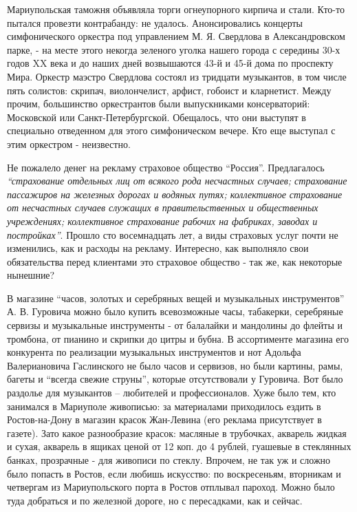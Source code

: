 Мариупольская таможня объявляла торги огнеупорного кирпича и стали. Кто-то
пытался провезти контрабанду: не удалось. Анонсировались концерты
симфонического оркестра под управлением М. Я. Свердлова в Александровском парке,
- на месте этого некогда зеленого уголка нашего города с середины 30-х годов XX
века и до наших дней возвышаются 43-й и 45-й дома по проспекту Мира. Оркестр
маэстро Свердлова состоял из тридцати музыкантов, в том числе пять солистов:
скрипач, виолончелист, арфист, гобоист и кларнетист. Между прочим, большинство
оркестрантов были выпускниками консерваторий: Московской или
Санкт-Петербургской. Обещалось, что они выступят в специально отведенном для
этого симфоническом вечере. Кто еще выступал с этим оркестром - неизвестно.

Не пожалело денег на рекламу страховое общество \enquote{Россия}. Предлагалось
\emph{\enquote{страхование отдельных лиц от всякого рода несчастных случаев; страхование
пассажиров на железных дорогах и водяных путях; коллективное страхование от
несчастных случаев служащих в правительственных и общественных учреждениях;
коллективное страхование рабочих на фабриках, заводах и постройках}}. Прошло сто
восемнадцать лет, а виды страховых услуг почти не изменились, как и расходы на
рекламу. Интересно, как выполняло свои обязательства перед клиентами это
страховое общество - так же, как некоторые нынешние?

В магазине \enquote{часов, золотых и серебряных вещей и музыкальных инструментов} А. В.
Гуровича можно было купить всевозможные часы, табакерки, серебряные сервизы и
музыкальные инструменты - от балалайки и мандолины до флейты и тромбона, от
пианино и скрипки до цитры и бубна. В ассортименте магазина его конкурента по
реализации музыкальных инструментов и нот Адольфа Валериановича Гаслинского не
было часов и сервизов, но были картины, рамы, багеты и \enquote{всегда свежие струны},
которые отсутствовали у Гуровича. Вот было раздолье для музыкантов – любителей
и профессионалов. Хуже было тем, кто занимался в Мариуполе живописью: за
материалами приходилось ездить в Ростов-на-Дону в магазин красок Жан-Левина
(его реклама присутствует в газете). Зато какое разнообразие красок: масляные в
трубочках, акварель жидкая и сухая, акварель в ящиках ценой от 12 коп. до 4
рублей, гуашевые в стеклянных банках, прозрачные - для живописи по стеклу.
Впрочем, не так уж и сложно было попасть в Ростов, если любишь искусство: по
воскресеньям, вторникам и четвергам из Мариупольского порта в Ростов отплывал
пароход. Можно было туда добраться и по железной дороге, но с пересадками, как
и сейчас.

